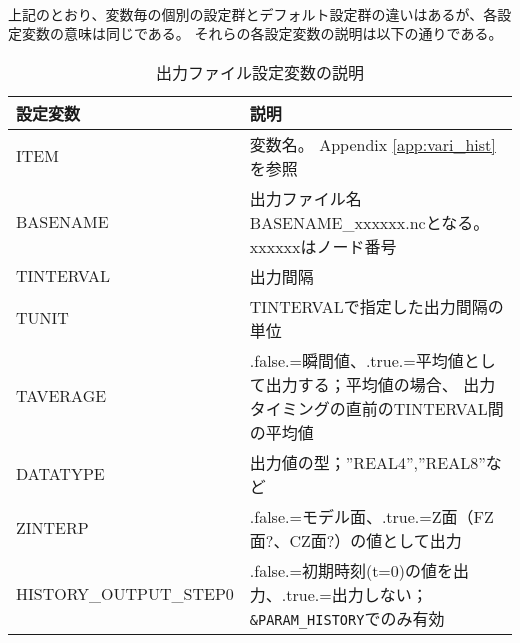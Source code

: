 {\small {\gt
{}}}\\

上記のとおり、変数毎の個別の設定群とデフォルト設定群の違いはあるが、各設定変数の意味は同じである。
それらの各設定変数の説明は以下の通りである。\\

\begin{table}[htb]
\begin{center}
\caption{出力ファイル設定変数の説明}
\begin{tabularx}{150mm}{|l|X|} \hline
 \rowcolor[gray]{0.9} 設定変数 & 説明 \\ \hline
 ITEM                   & 変数名。 Appendix \ref{app:vari_hist}を参照\\ \hline
 BASENAME               & 出力ファイル名 BASENAME\_xxxxxx.ncとなる。xxxxxxはノード番号\\ \hline
 TINTERVAL              & 出力間隔\\ \hline
 TUNIT                  & TINTERVALで指定した出力間隔の単位\\ \hline
 TAVERAGE               & .false.=瞬間値、.true.=平均値として出力する；平均値の場合、
 出力タイミングの直前のTINTERVAL間の平均値\\ \hline
 DATATYPE               & 出力値の型；''REAL4'',''REAL8''など\\ \hline
 ZINTERP                & .false.=モデル面、.true.=Z面（FZ面$?$、CZ面$?$）の値として出力\\ \hline
 HISTORY\_OUTPUT\_STEP0 & .false.=初期時刻(t=0)の値を出力、.true.=出力しない；\verb|&PARAM_HISTORY|でのみ有効\\ \hline
\end{tabularx}
\label{tab:history_settings}
\end{center}
\end{table}

